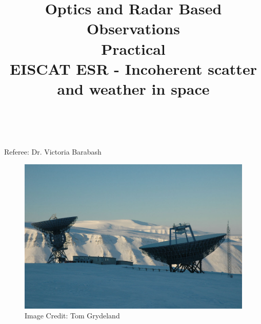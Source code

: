 \documentclass{article}
\title{\textbf {Optics and Radar Based Observations} \\ Practical\\ EISCAT ESR - Incoherent scatter and weather in space} %
\author{\authorivan\\\authoranu}
\begin{document}
\maketitle %

\centerline{Referee: Dr. Victoria Barabash}

\vspace{10mm}

\begin{figure}[h!]
\centering
\includegraphics[width=\textwidth]{Figures/eiscat.jpg}
\caption*{Image Credit: Tom Grydeland}
\end{figure}

\setlength\parindent{0pt} %

\renewcommand{\labelenumi}{\alph{enumi}.} %
\clearpage

\tableofcontents

\listoffigures

\clearpage

\end{document}

